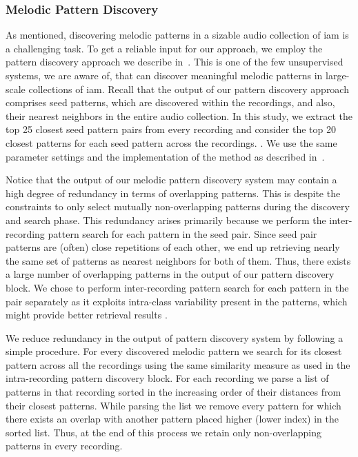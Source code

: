 {\subsubsection{Melodic Pattern Discovery}
\label{sec:patterns_characterization_pattern_discovery}

As mentioned, discovering melodic patterns in a sizable audio collection of \gls{iam} is a challenging task. To get a reliable input for our approach, we employ the pattern discovery approach we describe in~. This is one of the few unsupervised systems, we are aware of, that can discover meaningful melodic patterns in large-scale collections of \gls{iam}. Recall that the output of our pattern discovery approach comprises seed patterns, which are discovered within the recordings, and also, their nearest neighbors in the entire audio collection. In this study, we extract the top 25 closest seed pattern pairs from every recording and consider the top 20 closest patterns for each seed pattern across the recordings. . We use the same parameter settings and the implementation of the method as described in~. 

Notice that the output of our melodic pattern discovery system may contain a high degree of redundancy in terms of overlapping patterns. This is despite the constraints to only select mutually non-overlapping patterns during the discovery and search phase. This redundancy arises primarily because we perform the inter-recording pattern search for each pattern in the seed pair. Since seed pair patterns are (often) close repetitions of each other, we end up retrieving nearly the same set of patterns as nearest neighbors for both of them. Thus, there exists a large number of overlapping patterns in the output of our pattern discovery block. We chose to perform inter-recording pattern search for each pattern in the pair separately as it exploits intra-class variability present in the patterns, which might provide better retrieval results . 

We reduce redundancy in the output of pattern discovery system by following a simple procedure. For every discovered melodic pattern we search for its closest pattern across all the recordings using the same similarity measure as used in the intra-recording pattern discovery block. For each recording we parse a list of patterns in that recording sorted in the increasing order of their distances from their closest patterns. While parsing the list we remove every pattern for which there exists an overlap with another pattern placed higher (lower index) in the sorted list. Thus, at the end of this process we retain only non-overlapping patterns in every recording.



}
